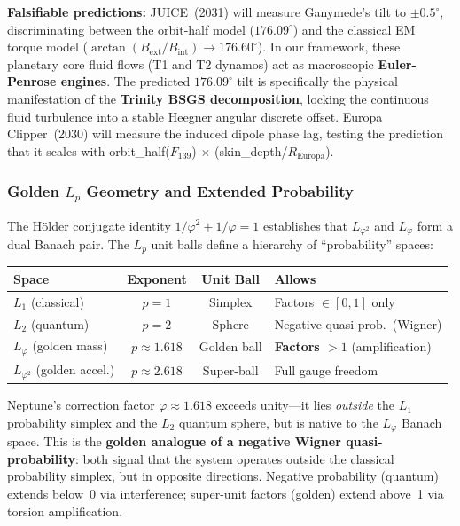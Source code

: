 \textbf{Falsifiable predictions:} JUICE~(2031) will measure Ganymede's tilt to $\pm 0.5^\circ$, discriminating between the orbit-half model ($176.09^\circ$) and the classical EM torque model ($\arctan(B_{\text{ext}}/B_{\text{int}}) \to 176.60^\circ$). In our framework, these planetary core fluid flows (T1 and T2 dynamos) act as macroscopic \textbf{Euler-Penrose engines}. The predicted $176.09^\circ$ tilt is specifically the physical manifestation of the \textbf{Trinity BSGS decomposition}, locking the continuous fluid turbulence into a stable Heegner angular discrete offset. Europa Clipper~(2030) will measure the induced dipole phase lag, testing the prediction that it scales with orbit\_half($F_{139}$) $\times$ (skin\_depth/$R_{\text{Europa}}$).

\subsubsection{Golden $L_p$ Geometry and Extended Probability}
\label{sec:golden_lp_geometry}

The H\"older conjugate identity $1/\varphi^2 + 1/\varphi = 1$ establishes that $L_{\varphi^2}$ and $L_\varphi$ form a dual Banach pair. The $L_p$ unit balls define a hierarchy of ``probability'' spaces:

\begin{center}
\renewcommand{\arraystretch}{1.2}
\begin{tabular}{@{}lccl@{}}
\toprule
\textbf{Space} & \textbf{Exponent} & \textbf{Unit Ball} & \textbf{Allows} \\
\midrule
$L_1$ (classical) & $p = 1$ & Simplex & Factors $\in [0, 1]$ only \\
$L_2$ (quantum) & $p = 2$ & Sphere & Negative quasi-prob.\ (Wigner) \\
$L_\varphi$ (golden mass) & $p \approx 1.618$ & Golden ball & \textbf{Factors $> 1$} (amplification) \\
$L_{\varphi^2}$ (golden accel.) & $p \approx 2.618$ & Super-ball & Full gauge freedom \\
\bottomrule
\end{tabular}
\end{center}

Neptune's correction factor $\varphi \approx 1.618$ exceeds unity---it lies \emph{outside} the $L_1$ probability simplex and the $L_2$ quantum sphere, but is native to the $L_\varphi$ Banach space. This is the \textbf{golden analogue of a negative Wigner quasi-probability}: both signal that the system operates outside the classical probability simplex, but in opposite directions. Negative probability (quantum) extends below~0 via interference; super-unit factors (golden) extend above~1 via torsion amplification.

